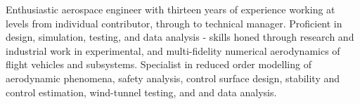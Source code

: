 \vspace{.5cm}
\bodyfont
\small
Enthusiastic aerospace engineer with thirteen years of experience working at levels from individual contributor, through to technical manager. Proficient in design, simulation, testing, and data analysis - skills honed through research and industrial work in experimental, and multi-fidelity numerical aerodynamics of flight vehicles and subsystems. Specialist in reduced order modelling of aerodynamic phenomena, safety analysis, control surface design, stability and control estimation, wind-tunnel testing, and and data analysis.